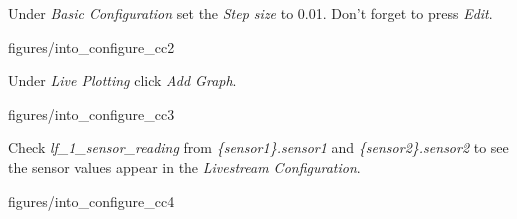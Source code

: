 \documentclass[11pt,a4paper]{../tutorial}
\begin{document}
\begin{instructions}

\newpage
\item Under \emph{Basic Configuration} set the \emph{Step size} to 0.01. Don't forget to press \emph{Edit}.

    \begin{annotation}[width=0.85\linewidth,trim=0 70 0 0,clip]{figures/into_configure_cc2}
    \end{annotation}


\item Under \emph{Live Plotting} click \emph{Add Graph}.

    \begin{annotation}[width=0.85\linewidth,trim=0 0 0 30,clip]{figures/into_configure_cc3}
    \end{annotation}


\item Check \emph{lf\_1\_sensor\_reading} from \emph{\{sensor1\}.sensor1} and \emph{\{sensor2\}.sensor2} to see the sensor values appear in the \emph{Live\-stream Configuration}.


    \begin{annotation}[width=0.85\linewidth,trim=0 200 0 0,clip]{figures/into_configure_cc4}
    \end{annotation}

\end{instructions}
\end{document}
